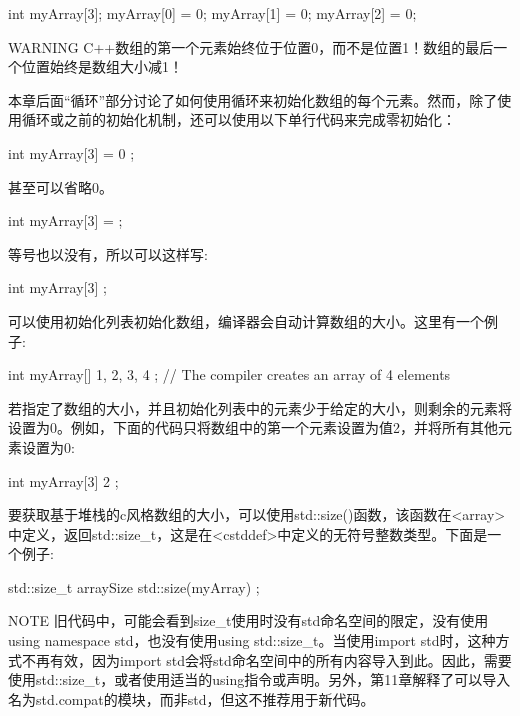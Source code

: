 \begin{cpp}
int myArray[3];
myArray[0] = 0;
myArray[1] = 0;
myArray[2] = 0;
\end{cpp}

\begin{myWarning}{WARNING}
C++数组的第一个元素始终位于位置0，而不是位置1！数组的最后一个位置始终是数组大小减1！
\end{myWarning}

本章后面“循环”部分讨论了如何使用循环来初始化数组的每个元素。然而，除了使用循环或之前的初始化机制，还可以使用以下单行代码来完成零初始化：

\begin{cpp}
int myArray[3] = { 0 };
\end{cpp}

甚至可以省略0。

\begin{cpp}
int myArray[3] = {};
\end{cpp}

等号也以没有，所以可以这样写:

\begin{cpp}
int myArray[3] {};
\end{cpp}

可以使用初始化列表初始化数组，编译器会自动计算数组的大小。这里有一个例子:

\begin{cpp}
int myArray[] { 1, 2, 3, 4 }; // The compiler creates an array of 4 elements
\end{cpp}

若指定了数组的大小，并且初始化列表中的元素少于给定的大小，则剩余的元素将设置为0。例如，下面的代码只将数组中的第一个元素设置为值2，并将所有其他元素设置为0:

\begin{cpp}
int myArray[3] { 2 };
\end{cpp}

要获取基于堆栈的c风格数组的大小，可以使用std::size()函数，该函数在<array>中定义，返回std::size\_t，这是在<cstddef>中定义的无符号整数类型。下面是一个例子:

\begin{cpp}
std::size_t arraySize { std::size(myArray) };
\end{cpp}

\begin{myNotic}{NOTE}
旧代码中，可能会看到size\_t使用时没有std命名空间的限定，没有使用using namespace std，也没有使用using std::size\_t。当使用import std时，这种方式不再有效，因为import std会将std命名空间中的所有内容导入到此。因此，需要使用std::size\_t，或者使用适当的using指令或声明。另外，第11章解释了可以导入名为std.compat的模块，而非std，但这不推荐用于新代码。
\end{myNotic}

